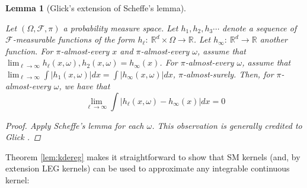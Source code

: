 \documentclass{article}
\newtheorem{lemma}{Lemma}
\theoremstyle{definition}
\begin{document}
\begin{lemma}[Glick's extension of Scheffe's lemma] \label{lem:glick}

Let $(\Omega, \mathcal{F},\pi)$ a probability measure space.  Let $h_1,h_2,h_3\cdots$ denote a sequence of $\mathcal{F}$-measurable functions of the form $h_\ell:\ \mathbb{R}^d \times \Omega \rightarrow \mathbb{R}$.  Let $h_\infty:\ \mathbb{R}^d \rightarrow\mathbb{R}$ another function.  For $\pi$-almost-every $x$ and $\pi$-almost-every $\omega$, assume that $\lim_{\ell \rightarrow \infty} h_\ell (x,\omega),h_2(x,\omega) = h_\infty (x)$.  For $\pi$-almost-every $\omega$, assume that  $\lim_{\ell \rightarrow \infty} \int |h_1(x,\omega)|dx = \int |h_\infty(x,\omega)|dx$, $\pi$-almost-surely.  Then, for $\pi$-almost-every $\omega$, we have that
\[
\lim_{\ell \rightarrow \infty} \int |h_\ell (x,\omega)-h_\infty(x)|dx = 0
\]
\begin{proof}
    Apply Scheffe's lemma for each $\omega$.  This observation is generally credited to Glick \cite{glick1974consistency}.
\end{proof}

\end{lemma} 

Theorem \ref{lem:kdereg} makes it straightforward to show that SM kernels (and, by extension LEG kernels) can be used to approximate any integrable continuous kernel:
\end{document}

